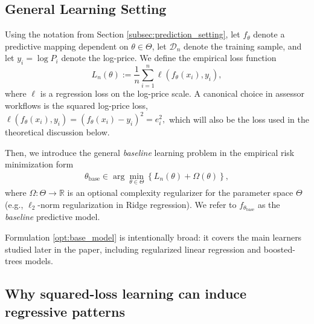 \documentclass[12pt, draft]{article}
\theoremstyle{plain}
\theoremstyle{definition}
\newcommand{\1}{\mathbf{1}}
\newcommand{\D}{\mathcal{D}}
\begin{document}
{%



\subsection{General Learning Setting}

Using the notation from Section \ref{subsec:prediction_setting}, let $f_\theta$ denote a predictive mapping dependent on $\theta \in \Theta$, let $\D_n$ denote the training sample, and let $y_i = \log P_i$ denote the log-price. We define the empirical loss function
\[
L_n(\theta)
:=
\frac{1}{n}\sum_{i=1}^n \ell(f_\theta(x_i),y_i),
\]
where $\ell$ is a regression loss on the log-price scale. A canonical choice in assessor workflows is the squared log-price loss,
$
\ell(f_\theta(x_i),y_i)=(f_\theta(x_i)-y_i)^2=e_i^2,
$
which will also be the loss used in the theoretical discussion below.

Then, we introduce the general \textit{baseline} learning problem in the empirical risk minimization form
\vspace{-4mm}
\begin{align}
\label{opt:base_model}
\theta_{\mathrm{base}}
\in
\arg\min_{\theta\in\Theta}
\left\{
L_n(\theta)+\Omega(\theta)
\right\},
\end{align}
where $\Omega:\Theta\to\mathbb R$ is an optional complexity regularizer for the parameter space $\Theta$ (e.g., $\ell_2$-norm regularization in Ridge regression). We refer to $f_{\theta_{\mathrm{base}}}$ as the \textit{baseline} predictive model. 

Formulation \eqref{opt:base_model} is intentionally broad: it covers the main learners studied later in the paper, including regularized linear regression and boosted-trees models.

\subsection{Why squared-loss learning can induce regressive patterns}
\label{subsec:squared_loss_regressivity}

}
\end{document}
